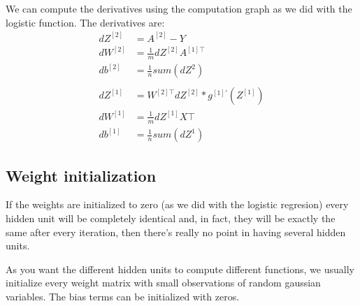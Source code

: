     We can compute the derivatives using the computation graph as we did with the logistic
    function. The derivatives are:
    \begin{align*}
        dZ^{[2]} &= A^{[2]} - Y \\
        dW^{[2]} &= \frac{1}{m} dZ^{[2]} A^{[1]\top} \\
        db^{[2]} &= \frac{1}{n} sum(dZ^{2}) \\ \\
        dZ^{[1]} &= W^{[2]\top} dZ^{[2]} * g^{[1]'}(Z^[1]) \\
        dW^{[1]} &= \frac{1}{m} dZ^{[1]} X\top \\
        db^{[1]} &= \frac{1}{n} sum(dZ^{1}) 
    \end{align*}
\subsection*{Weight initialization}
    If the weights are initialized to zero (as we did with the logistic regresion) every
    hidden unit will be completely identical and, in fact, they will be exactly the same
    after every iteration, then there's really no point in having several hidden units.

    As you want the different hidden units to compute different functions, we usually
    initialize every weight matrix with small observations of random gaussian variables.
    The bias terms can be initialized with zeros.

